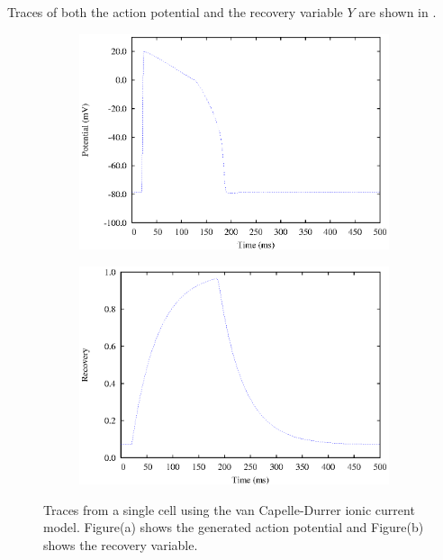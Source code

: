 Traces of both the action potential and the recovery variable $Y$ are shown in
.  
\begin{figure}[hbtp] 
  \centering
  \begin{subfigure}[b]{0.45\linewidth}
    \centering
    \includegraphics[width=\textwidth]{cardiac_electrophysiology/epsfiles/VCDVm.eps}
    \caption{}
  \end{subfigure}
  \hfill
  \begin{subfigure}[b]{0.45\linewidth}
    \centering
    \includegraphics[width=\textwidth]{cardiac_electrophysiology/epsfiles/VCDRecov.eps}
    \caption{}
  \end{subfigure}
  \caption[Traces from a single cell using the van Capelle-Durrer ionic current
  model]{Traces from a single cell using the van Capelle-Durrer ionic current
    model. Figure(a) shows the generated action potential and Figure(b) shows
    the recovery variable.}
  \label{fig:VCD_1_cell_traces}
\end{figure}




